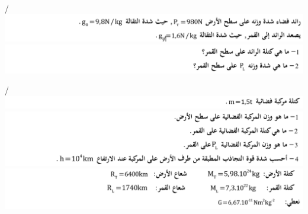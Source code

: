 \documentclass[12pt,a4paper]{article}
\begin{document}
\begin{exercice}{}/
					\includegraphics[width=\linewidth]{images/Tc/p1/e14_1.png}
					\includegraphics[width=\linewidth]{images/Tc/p1/e14_2.png}
					\end{exercice}%
\begin{exercice}{}/
					\includegraphics[width=\linewidth]{images/Tc/p1/e16_1.png}
					\includegraphics[width=\linewidth]{images/Tc/p1/e16_2.png}
					\includegraphics[width=\linewidth]{images/Tc/p1/e16_3.png}
					\end{exercice}%
  
\end{document}
